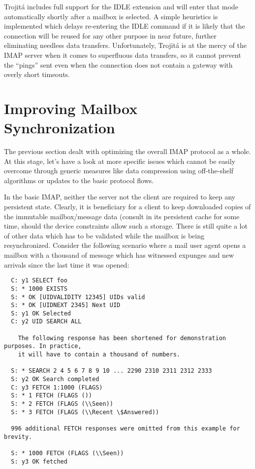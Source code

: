 \documentclass[trojita]{subfiles}
\begin{document}
\begin{trojitabehavior}
Trojitá includes full support for the IDLE extension and will enter that mode automatically shortly after a mailbox is
selected.  A simple heuristics is implemented which delays re-entering the IDLE command if it is likely that the
connection will be reused for any other purpose in near future, further eliminating needless data transfers.
Unfortunately, Trojitá is at the mercy of the IMAP server when it comes to superfluous data transfers, so it cannot
prevent the ``pings'' sent even when the connection does not contain a gateway with overly short timeouts.
\end{trojitabehavior}

\section{Improving Mailbox Synchronization}

The previous section dealt with optimizing the overall IMAP protocol as a whole.  At this stage, let's have a look at
more specific issues which cannot be easily overcome through generic measures like data compression using off-the-shelf
algorithms or updates to the basic protocol flows.

In the basic IMAP, neither the server not the client are required to keep any persistent state.  Clearly, it is
beneficiary for a client to keep downloaded copies of the immutable mailbox/message data (consult
 in its persistent cache for some time, should the device constraints allow such a
storage.  There is still quite a lot of other data which has to be validated while the mailbox is being resynchronized.
Consider the following scenario where a mail user agent opens a mailbox with a thousand of message which has witnessed
expunges and new arrivals since the last time it was opened:

\begin{verbatim}
  C: y1 SELECT foo
  S: * 1000 EXISTS
  S: * OK [UIDVALIDITY 12345] UIDs valid
  S: * OK [UIDNEXT 2345] Next UID
  S: y1 OK Selected
  C: y2 UID SEARCH ALL

    The following response has been shortened for demonstration purposes. In practice,
    it will have to contain a thousand of numbers.

  S: * SEARCH 2 4 5 6 7 8 9 10 ... 2290 2310 2311 2312 2333
  S: y2 OK Search completed
  C: y3 FETCH 1:1000 (FLAGS)
  S: * 1 FETCH (FLAGS ())
  S: * 2 FETCH (FLAGS (\\Seen))
  S: * 3 FETCH (FLAGS (\\Recent \$Answered))

  996 additional FETCH responses were omitted from this example for brevity.

  S: * 1000 FETCH (FLAGS (\\Seen))
  S: y3 OK fetched
\end{verbatim}
\end{document}
